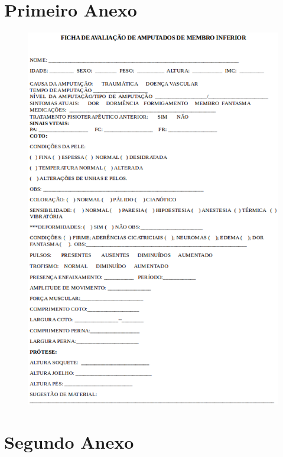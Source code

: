\begin{anexosenv}

\partanexos

\chapter{Primeiro Anexo}
\begin{figure}[H]
	    \label{fig21}
	        \includegraphics[keepaspectratio=true, scale=0.5]{editaveis/images/ficha_mestrado_amputados.eps}
\end{figure}
\newpage
\chapter{Segundo Anexo}


\end{anexosenv}
